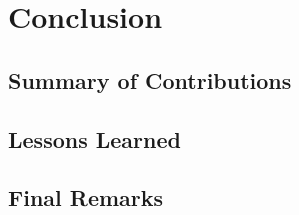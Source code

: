 \chapter{Conclusion} \label{cap:conclusion}


\section{Summary of Contributions}
\lipsum[1]


\section{Lessons Learned}
\lipsum[1]


\section{Final Remarks}
\lipsum[1]
